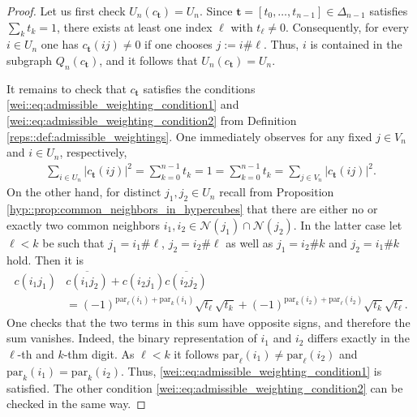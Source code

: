 \documentclass[a4paper]{amsart}
\begin{document}
\begin{proof}
    Let us first check $U_n(c_\mathbf{t}) = U_n$. Since $\mathbf{t} = [t_0, \dots, t_{n-1}] \in \Delta_{n-1}$ satisfies $\sum_k t_k = 1$, there exists at least one index $\ell$ with $t_\ell \neq 0$. Consequently, for every $i \in U_n$ one has $c_\mathbf{t}(ij) \neq 0$ if one chooses $j := i \# \ell$. Thus, $i$ is contained in the subgraph $Q_n(c_\mathbf{t})$, and it follows that $U_n(c_\mathbf{t}) = U_n$.

    It remains to check that $c_\mathbf{t}$ satisfies the conditions \eqref{wei::eq:admissible_weighting_condition1} and \eqref{wei::eq:admissible_weighting_condition2} from Definition \ref{reps::def:admissible_weightings}. One immediately observes for any fixed $j \in V_n$ and $i \in U_n$, respectively,
    \begin{align*}
        \sum_{i \in U_n} |c_\mathbf{t}(ij)|^2 = \sum_{k=0}^{n-1} t_k = 1 = \sum_{k=0}^{n-1} t_k = \sum_{j \in V_n} |c_\mathbf{t}(ij)|^2.
    \end{align*}
    On the other hand, for distinct $j_1, j_2 \in U_n$ recall from Proposition \ref{hyp::prop:common_neighbors_in_hypercubes} that there are either no or exactly two common neighbors $i_1, i_2 \in \mathcal{N}(j_1) \cap \mathcal{N}(j_2)$. In the latter case let $\ell < k$ be such that $j_1 = i_1 \# \ell$, $j_2 = i_2 \# \ell$ as well as $j_1 = i_2 \# k$ and $j_2 = i_1 \# k$ hold.
    Then it is
    \begin{align*}
        c(i_1 j_1) &\overline{c(i_1 j_2)} + c(i_2 j_1) \overline{c(i_2 j_2)} \\
            &= (-1)^{\mathrm{par}_\ell(i_1) + \mathrm{par}_k(i_1)} \sqrt{t_\ell} \sqrt{t_k} + (-1)^{\mathrm{par}_k(i_2) + \mathrm{par}_\ell(i_2)} \sqrt{t_k} \sqrt{t_\ell}.
    \end{align*}
    One checks that the two terms in this sum have opposite signs, and therefore the sum vanishes. Indeed, the binary representation of $i_1$ and $i_2$ differs exactly in the $\ell$-th and $k$-thm digit. As $\ell < k$ it follows $\mathrm{par}_\ell(i_1) \neq \mathrm{par}_\ell(i_2)$ and $\mathrm{par}_k(i_1) = \mathrm{par}_k(i_2)$.
    Thus, \eqref{wei::eq:admissible_weighting_condition1} is satisfied. The other condition \eqref{wei::eq:admissible_weighting_condition2} can be checked in the same way. 
\end{proof}
\end{document}
